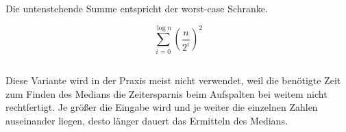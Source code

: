 \documentclass[10pt,a4paper,oneside,ngerman,numbers=noenddot]{scrartcl}
\begin{document}
		Die untenstehende Summe entspricht der worst-case Schranke.
		
		\[
			\sum\limits_{i=0}^{\log n} \left(\frac{n}{2^{i}}\right)^{2}
		\]
	\subsection{} %
		Diese Variante wird in der Praxis meist nicht verwendet, weil die benötigte Zeit zum Finden des Medians die Zeitersparnis beim Aufspalten bei weitem nicht rechtfertigt. Je größer die Eingabe wird und je weiter die einzelnen Zahlen auseinander liegen, desto länger dauert das Ermitteln des Medians.
	\subsection{} %
\section{} %
	\subsection{} %
	\subsection{} %
	\subsection{} %
\section{} %
\end{document}
